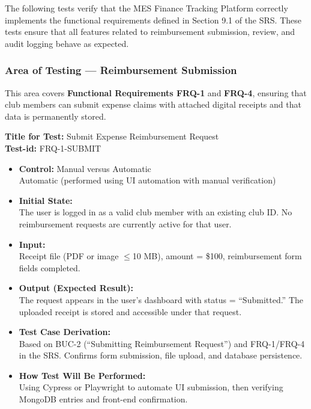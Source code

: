 \documentclass[12pt, titlepage]{article}
\begin{document}


The following tests verify that the MES Finance Tracking Platform correctly implements the functional requirements defined in Section 9.1 of the SRS. 
These tests ensure that all features related to reimbursement submission, review, and audit logging behave as expected.

\subsubsection{Area of Testing — Reimbursement Submission}

This area covers \textbf{Functional Requirements FRQ-1} and \textbf{FRQ-4}, ensuring that club members can submit expense claims with attached digital receipts and that data is permanently stored.

\textbf{Title for Test:} Submit Expense Reimbursement Request \\
\textbf{Test-id:} FRQ-1-SUBMIT

\begin{itemize}
    \item \textbf{Control:} Manual versus Automatic \\
    Automatic (performed using UI automation with manual verification)
    \item \textbf{Initial State:} \\
    The user is logged in as a valid club member with an existing club ID. No reimbursement requests are currently active for that user.
    \item \textbf{Input:} \\
    Receipt file (PDF or image $\leq$10 MB), amount = \$100, reimbursement form fields completed.
    \item \textbf{Output (Expected Result):} \\
    The request appears in the user’s dashboard with status = ``Submitted.'' The uploaded receipt is stored and accessible under that request.
    \item \textbf{Test Case Derivation:} \\
    Based on BUC-2 (``Submitting Reimbursement Request'') and FRQ-1/FRQ-4 in the SRS. Confirms form submission, file upload, and database persistence.
    \item \textbf{How Test Will Be Performed:} \\
    Using Cypress or Playwright to automate UI submission, then verifying MongoDB entries and front-end confirmation.
\end{itemize}
\end{document}
